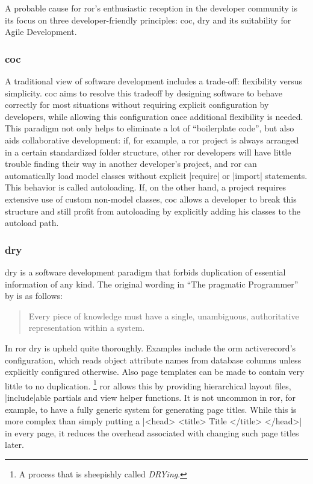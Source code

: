 A probable cause for \gls{ror}'s enthusiastic reception in the developer community is its focus on three developer-friendly principles: \gls{coc}, \gls{dry} and its suitability for Agile Development.\citep{agilewebdev}

\subsubsection{\acrlong{coc}}

A traditional view of software development includes a trade-off: flexibility versus simplicity. \acrshort{coc} aims to resolve this tradeoff by designing software to behave correctly for most situations without requiring explicit configuration by developers, while allowing this configuration once additional flexibility is needed. This paradigm not only helps to eliminate a lot of ``boilerplate code'', but also aids collaborative development: if, for example, a \gls{ror} project is always arranged in a certain standardized folder structure, other \gls{ror} developers will have little trouble finding their way in another developer's project, and \gls{ror} can automatically load model classes without explicit |require| or |import| statements. This behavior is called autoloading. If, on the other hand, a project requires extensive use of custom non-model classes, \acrshort{coc} allows a developer to break this structure and still profit from autoloading by explicitly adding his classes to the autoload path.\citep{railsautoloading}

\subsubsection{\acrlong{dry}}

\acrshort{dry} is a software development paradigm that forbids duplication of essential information of any kind. The original wording in ``The pragmatic Programmer'' by \citet{Hunt:2000:PPJ:320326} is as follows:

\begin{quote}
  
Every piece of knowledge must have a single, unambiguous, authoritative representation within a system.
  
\end{quote}

In \gls{ror} \acrlong{dry} is upheld quite thoroughly. Examples include the \acrfull{orm} \gls{activerecord}'s configuration, which reads object attribute names from database columns unless explicitly configured otherwise. Also page templates can be made to contain very little to no duplication. \footnote{A process that is sheepishly called \emph{DRYing}.} \gls{ror} allows this by providing hierarchical layout files, |include|able partials and view helper functions. It is not uncommon in \gls{ror}, for example, to have a fully generic system for generating page titles. While this is more complex than simply putting a |<head> <title> Title </title> </head>| in every page, it reduces the overhead associated with changing such page titles later.

